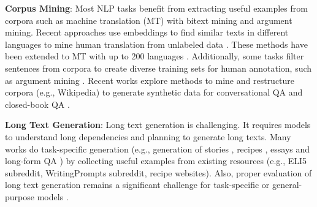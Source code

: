 	\textbf{Corpus Mining}: Most NLP tasks benefit from extracting useful examples from corpora such as machine translation (MT) with bitext mining \cite{resnik-1999-mining} and argument mining. Recent approaches use embeddings to find similar texts in different languages to mine human translation from unlabeled data \cite{artetxe-schwenk-2019-margin}. These methods have been extended to MT with up to 200 languages \cite{nllbteam2022language}. Additionally, some tasks filter sentences from corpora to create diverse training sets for human annotation, such as argument mining \cite{ein2020corpus}. Recent works explore methods to mine and restructure corpora (e.g., Wikipedia)   to generate synthetic data for conversational QA \cite{zhunyun2022dialog} and closed-book QA \cite{lewis-etal-2021-paq}. 

	\textbf{Long Text Generation}: Long text generation is challenging. It requires models to understand long dependencies and planning to generate long texts. Many works do task-specific generation (e.g.,  generation of stories \cite{fan-etal-2018-hierarchical}, recipes  \cite{bien-etal-2020-recipenlg}, essays \cite{feng2018topic} and long-form QA \cite{fan-etal-2019-eli5}) by collecting useful examples from existing resources (e.g., ELI5 subreddit, WritingPrompts subreddit, recipe websites). Also, proper evaluation of long text generation remains a significant challenge for task-specific or general-purpose models \cite{celikyilmaz2020evaluation}.


